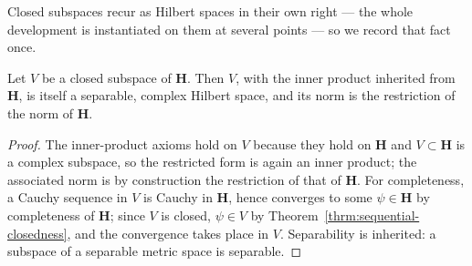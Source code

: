 Closed subspaces recur as Hilbert spaces in their own right — the whole development is instantiated on them at several points — so we record that fact once.

\begin{lemma}
    \label{lmm:closed-subspace-is-hilbert}
    \leanok
    Let $V$ be a closed subspace of $\mathbf{H}$. Then $V$, with the inner product inherited from $\mathbf{H}$, is itself a separable, complex Hilbert space, and its norm is the restriction of the norm of $\mathbf{H}$.
\end{lemma}
\begin{proof}
    \leanok
The inner-product axioms hold on $V$ because they hold on $\mathbf{H}$ and $V \subset \mathbf{H}$ is a complex subspace, so the restricted form is again an inner product; the associated norm is by construction the restriction of that of $\mathbf{H}$. For completeness, a Cauchy sequence in $V$ is Cauchy in $\mathbf{H}$, hence converges to some $\psi \in \mathbf{H}$ by completeness of $\mathbf{H}$; since $V$ is closed, $\psi \in V$ by Theorem~\ref{thrm:sequential-closedness}, and the convergence takes place in $V$. Separability is inherited: a subspace of a separable metric space is separable.
\end{proof}

